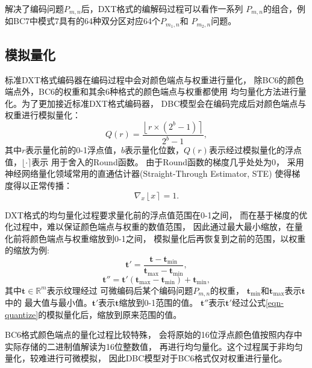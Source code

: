 解决了编码问题$P_{m,n}$后，DXT格式的编解码过程可以看作一系列
$P_{m,n}$的组合，例如BC7中模式7具有的64种双分区对应64个$P_{m_1,n}$和
$P_{m_2,n}$问题。

\subsection{模拟量化}
\label{模拟量化}

标准DXT格式编码器在编码过程中会对颜色端点与权重进行量化，
除BC6的颜色端点外，BC6的权重和其余6种格式的颜色端点与权重都使用
均匀量化方法进行量化。为了更加接近标准DXT格式编码器，
DBC模型会在编码完成后对颜色端点与权重进行模拟量化：
\begin{equation}\label{eqn-quantize}
    Q(r)=\frac{\left \lfloor r \times (2^{b}-1) \right \rceil}{2^{b}-1},
\end{equation}
其中$r$表示量化前的0-1浮点值，$b$表示量化位数，$Q(r)$表示经过模拟量化的浮点值，$\lfloor \cdot \rceil$表示
用于舍入的Round函数。
由于Round函数的梯度几乎处处为0，
采用神经网络量化领域常用的直通估计器\cite{bengio2013estimating}(Straight-Through Estimator, STE)
使得梯度得以正常传播：
\begin{equation}\label{eqn-7}
    \nabla_{x} \left \lfloor x \right \rceil=1.
\end{equation}

DXT格式的均匀量化过程要求量化前的浮点值范围在0-1之间，
而在基于梯度的优化过程中，难以保证颜色端点与权重的数值范围，
因此通过最大最小缩放，在量化前将颜色端点与权重缩放到0-1之间，
模拟量化后再恢复到之前的范围，以权重的缩放为例:
\begin{equation}
    \mathbf{t'}=\frac{\mathbf{t}-\mathbf{t}_\text{min}}{\mathbf{t}_\text{max}-\mathbf{t}_\text{min}},
\end{equation}
\begin{equation}
    \mathbf{t''}=\mathbf{t'}(\mathbf{t}_\text{max}-\mathbf{t}_\text{min})+\mathbf{t}_\text{min},
\end{equation}
其中$\mathbf{t}\in\mathbb{R}^m$表示纹理经过
可微编码后某个编码问题$P_{m,n}$的权重，
$\mathbf{t}_\text{min}$和$\mathbf{t}_\text{max}$表示$\mathbf{t}$中的
最大值与最小值。$\mathbf{t'}$表示$\mathbf{t}$缩放到0-1范围的值。
$\mathbf{t''}$表示$\mathbf{t'}$经过公式\ref{eqn-quantize}的模拟量化后，缩放到原来范围的值。


BC6格式颜色端点的量化过程比较特殊，
会将原始的16位浮点颜色值按照内存中实际存储的二进制值解读为16位整数值，
再进行均匀量化。这个过程属于非均匀量化，较难进行可微模拟，
因此DBC模型对于BC6格式仅对权重进行量化。

